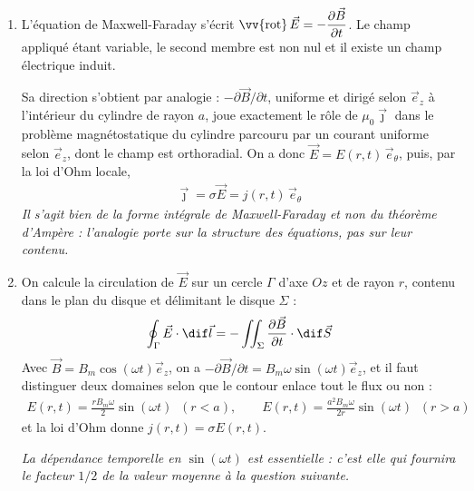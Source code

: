 \begin{correction}

\begin{enumerate}

	\item L'équation de Maxwell-Faraday s'écrit $\vv{\mathrm{rot}}\,\vec{E}=-\dfrac{\partial\vec{B}}{\partial t}$. Le champ appliqué étant variable, le second membre est non nul et il existe un champ électrique induit.

	Sa direction s'obtient par analogie : $-\partial\vec{B}/\partial t$, uniforme et dirigé selon $\vec{e}_z$ à l'intérieur du cylindre de rayon $a$, joue exactement le rôle de $\mu_0\vec{\jmath}$ dans le problème magnétostatique du cylindre parcouru par un courant uniforme selon $\vec{e}_z$, dont le champ est orthoradial. On a donc $\vec{E}=E(r,t)\,\vec{e}_\theta$, puis, par la loi d'Ohm locale,
	\begin{align*}
		\boxed{\vec{\jmath}=\sigma\vec{E}=j(r,t)\,\vec{e}_\theta}
	\end{align*}
	\textit{Il s'agit bien de la forme intégrale de Maxwell-Faraday et non du théorème d'Ampère : l'analogie porte sur la structure des équations, pas sur leur contenu.}

	\item On calcule la circulation de $\vec{E}$ sur un cercle $\Gamma$ d'axe $Oz$ et de rayon $r$, contenu dans le plan du disque et délimitant le disque $\Sigma$ :
	\begin{align*}
		\oint_\Gamma\vec{E}\cdot\dif\vec{l}=-\iint_\Sigma\frac{\partial\vec{B}}{\partial t}\cdot\dif\vec{S}
	\end{align*}
	Avec $\vec{B}=B_m\cos(\omega t)\vec{e}_z$, on a $-\partial\vec{B}/\partial t=B_m\omega\sin(\omega t)\vec{e}_z$, et il faut distinguer deux domaines selon que le contour enlace tout le flux ou non :
	\begin{align*}
		\boxed{E(r,t)=\frac{rB_m\omega}{2}\sin(\omega t)\;\;(r<a),
		\qquad
		E(r,t)=\frac{a^2B_m\omega}{2r}\sin(\omega t)\;\;(r>a)}
	\end{align*}
	et la loi d'Ohm donne $j(r,t)=\sigma E(r,t)$.

	\textit{La dépendance temporelle en $\sin(\omega t)$ est essentielle : c'est elle qui fournira le facteur $1/2$ de la valeur moyenne à la question suivante.}


\end{enumerate}
\end{correction}
